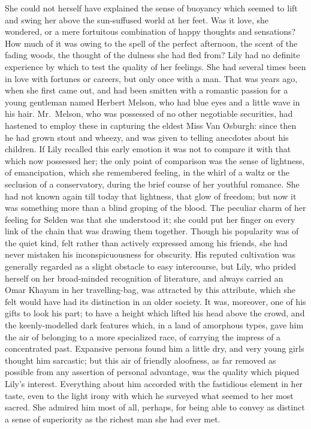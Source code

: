 \documentclass[12pt,a4paper]{book}
\begin{document}
She could not herself have explained the sense of buoyancy which
seemed to lift and swing her above the sun-suffused world at her
feet. Was it love, she wondered, or a mere fortuitous combination
of happy thoughts and sensations? How much of it was owing to the
spell of the perfect afternoon, the scent of the fading woods,
the thought of the dulness she had fled from? Lily had no
definite experience by which to test the quality of her feelings. 
She had several times been in love with fortunes or careers, but
only once with a man. That was years ago, when she first came
out, and had been smitten with a romantic passion for a young
gentleman named Herbert Melson, who had blue eyes and a little
wave in his hair. Mr.\ Melson, who was possessed of no other
negotiable securities, had hastened to employ these in capturing
the eldest Miss Van Osburgh: since then he had grown stout and
wheezy, and was given to telling anecdotes about his children. If
Lily recalled this early emotion it was not to compare it with
that which now possessed her; the only point of comparison was
the sense of lightness, of emancipation, which she remembered
feeling, in the whirl of a waltz or the seclusion of a
conservatory, during the brief course of her youthful romance. 
She had not known again till today that lightness, that glow of
freedom; but now it was something more than a blind groping of
the blood. The peculiar charm of her feeling for Selden
was that she understood it; she could put her finger on every
link of the chain that was drawing them together. Though his
popularity was of the quiet kind, felt rather than actively
expressed among his friends, she had never mistaken his
inconspicuousness for obscurity. His reputed cultivation was
generally regarded as a slight obstacle to easy intercourse, but
Lily, who prided herself on her broad-minded recognition of
literature, and always carried an Omar Khayam in her
travelling-bag, was attracted by this attribute, which she felt
would have had its distinction in an older society. It was,
moreover, one of his gifts to look his part; to have a height
which lifted his head above the crowd, and the keenly-modelled
dark features which, in a land of amorphous types, gave him the
air of belonging to a more specialized race, of carrying the
impress of a concentrated past. Expansive persons found him a
little dry, and very young girls thought him sarcastic; but this
air of friendly aloofness, as far removed as possible from any
assertion of personal advantage, was the quality which piqued
Lily's interest. Everything about him accorded with the
fastidious element in her taste, even to the light irony with
which he surveyed what seemed to her most sacred. She admired him
most of all, perhaps, for being able to convey as distinct a
sense of superiority as the richest man she had ever met.
\end{document}
